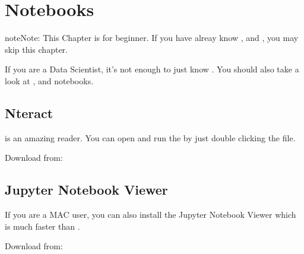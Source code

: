 \documentclass[letterpaper,12pt,english]{sphinxmanual}
\begin{document}
\chapter{Notebooks}
\label{\detokenize{nb:notebooks}}\label{\detokenize{nb:nb}}\label{\detokenize{nb::doc}}
\begin{sphinxadmonition}{note}{Note:}
\sphinxAtStartPar
This Chapter {\hyperref[\detokenize{nb:nb}]{}} is for beginner.  If you have alreay know
,  and , you may skip this chapter.
\end{sphinxadmonition}

\sphinxAtStartPar
If you are a Data Scientist, it’s not enough to just know . You should
also take a look at ,  and  notebooks.


\section{Nteract}
\label{\detokenize{nb:nteract}}
\sphinxAtStartPar
{} is an amazing  reader. You can open and run the  by
just double clicking the  file.

\sphinxAtStartPar
Download from: 

\begin{figure}[htbp]
\centering

\noindent{}
\end{figure}


\section{Jupyter Notebook Viewer}
\label{\detokenize{nb:jupyter-notebook-viewer}}
\sphinxAtStartPar
If you are a MAC user, you can also install the Jupyter Notebook Viewer
\textendash{} which is much faster than .

\sphinxAtStartPar
Download from: 

\begin{figure}[htbp]
\centering

\noindent{}
\end{figure}
\end{document}
